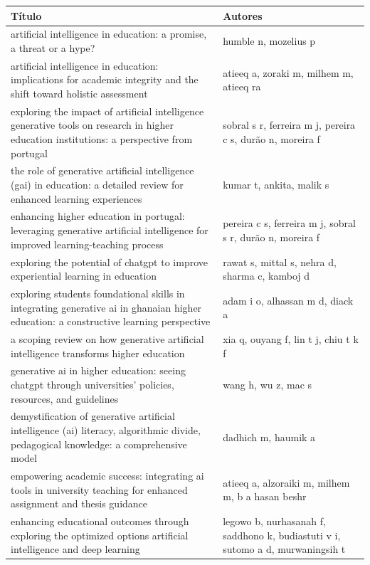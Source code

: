\documentclass[openany,oneside,a4paper,11pt]{extarticle}
\begin{document}
\begin{longtable}{|p{10cm}|p{6cm}|}
    \hline
    \textbf{Título} & \textbf{Autores} \\ 
    \hline
    artificial intelligence in education: a promise, a threat or a hype? & humble n, mozelius p \\
    \hline
    artificial intelligence in education: implications for academic integrity and the shift toward holistic assessment & atieeq a, zoraki m, milhem m, atieeq ra \\
    \hline
    exploring the impact of artificial intelligence generative tools on research in higher education institutions: a perspective from portugal & sobral s r, ferreira m j, pereira c s, durão n, moreira f \\
    \hline
    the role of generative artificial intelligence (gai) in education: a detailed review for enhanced learning experiences & kumar t, ankita, malik s \\
    \hline
    enhancing higher education in portugal: leveraging generative artificial intelligence for improved learning-teaching process & pereira c s, ferreira m j, sobral s r, durão n, moreira f \\
    \hline
    exploring the potential of chatgpt to improve experiential learning in education & rawat s, mittal s, nehra d, sharma c, kamboj d \\
    \hline
    exploring students foundational skills in integrating generative ai in ghanaian higher education: a constructive learning perspective & adam i o, alhassan m d, diack a \\
    \hline
    a scoping review on how generative artificial intelligence transforms higher education & xia q, ouyang f, lin t j, chiu t k f \\
    \hline
    generative ai in higher education: seeing chatgpt through universities' policies, resources, and guidelines & wang h, wu z, mac s \\
    \hline
    demystification of generative artificial intelligence (ai) literacy, algorithmic divide, pedagogical knowledge: a comprehensive model & dadhich m, haumik a \\
    \hline
    empowering academic success: integrating ai tools in university teaching for enhanced assignment and thesis guidance & atieeq a, alzoraiki m, milhem m, b a hasan beshr \\
    \hline
    enhancing educational outcomes through exploring the optimized options artificial intelligence and deep learning & legowo b, nurhasanah f, saddhono k, budiastuti v i, sutomo a d, murwaningsih t \\

\end{longtable}
\end{document}
